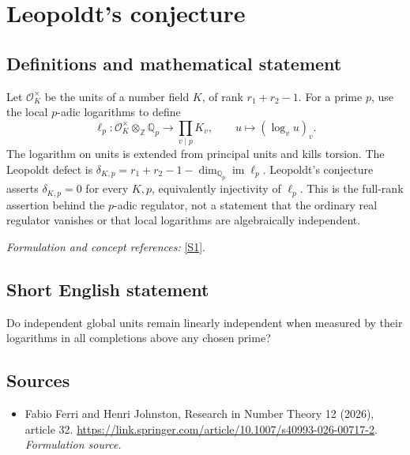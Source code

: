 \documentclass[11pt]{article}
\begin{document}
\section*{\texorpdfstring{Leopoldt's conjecture}{Leopoldt's conjecture}}\label{156}
\subsection{Definitions and mathematical statement}
Let $\mathcal O_K^\times$ be the units of a number field $K$, of rank $r_1+r_2-1$. For a prime $p$, use the local $p$-adic logarithms to define
\[
 \ell_p:\mathcal O_K^\times\otimes_{{\mathbb{Z}}}{\mathbb{Q}}_p\longrightarrow\prod_{v\mid p}K_v,
 \qquad u\longmapsto(\log_v u)_v.
\]
The logarithm on units is extended from principal units and kills torsion. The Leopoldt defect is
$\delta_{K,p}=r_1+r_2-1-\dim_{{\mathbb{Q}}_p}\operatorname{im}\ell_p$.
Leopoldt's conjecture asserts $\delta_{K,p}=0$ for every $K,p$, equivalently injectivity of $\ell_p$. This is the full-rank assertion behind the $p$-adic regulator, not a statement that the ordinary real regulator vanishes or that local logarithms are algebraically independent.
\par\smallskip\textit{Formulation and concept references:} \href{https://link.springer.com/article/10.1007/s40993-026-00717-2}{[S1]}.

\subsection{Short English statement}
Do independent global units remain linearly independent when measured by their logarithms in all completions above any chosen prime?
\subsection{Sources}
\begin{itemize}
\item[S1]Fabio Ferri and Henri Johnston, Research in Number Theory 12 (2026), article 32.
\url{https://link.springer.com/article/10.1007/s40993-026-00717-2}.
\textit{Formulation source.}
\end{itemize}
\end{document}
